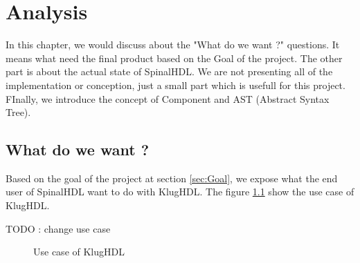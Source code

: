 \chapter{Analysis} %
\label{cha:Analysis}

In this chapter, we would discuss about the "What do we want ?" questions. It means what need the final product based on the Goal of the project. The other part is about the actual state of SpinalHDL. We are not presenting all of the implementation or conception, just a small part which is usefull for this project. FInally, we introduce the concept of Component and AST (Abstract Syntax Tree).

\section{What do we want ?} %
\label{sec:What do we want ?}

Based on the goal of the project at section \ref{sec:Goal}, we expose what the end user of SpinalHDL want to do with KlugHDL. The figure \ref{fig:use_case_klughdl} show the use case of KlugHDL.

TODO : change use case

\begin{figure}[] %
    \centering


    \caption{Use case of KlugHDL}
    \label{fig:use_case_klughdl}
\end{figure} %

